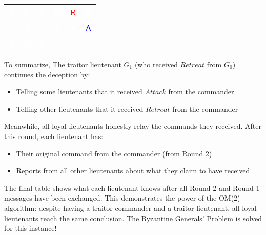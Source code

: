 \documentclass[11pt]{article}
\newcommand{\cmdA}{\ensuremath{\mathsf{A}}} %
\newcommand{\cmdR}{\ensuremath{\mathsf{R}}} %
\newcommand{\gen}[1]{\ensuremath{G_{#1}}}
\begin{document}
\begin{center}
\begin{tabular}{c|c|c|c|c|c}
    \hline
    \cellcolor{red!75}\textbf{\textcolor{white}{R}} & \cellcolor{red!75}\textbf{\textcolor{white}{R}} & \cellcolor{red!75}\textbf{\textcolor{white}{R}} & \cellcolor{red!75}\textbf{\textcolor{white}{R}} & \cellcolor{yellow!30}\textbf{\textcolor{red}{\cmdR}} & \cellcolor{red!75}\textbf{\textcolor{white}{R}} \\
    \hline
    \cellcolor{blue!75}\textbf{\textcolor{white}{A}} & \cellcolor{blue!75}\textbf{\textcolor{white}{A}} & \cellcolor{blue!75}\textbf{\textcolor{white}{A}} & \cellcolor{blue!75}\textbf{\textcolor{white}{A}} & \cellcolor{blue!75}\textbf{\textcolor{white}{A}} & \cellcolor{yellow!30}\textbf{\textcolor{blue}{\cmdA}} \\
    \hline
    \hline
    \cellcolor{red!45}\textbf{\textcolor{white}{R}} & \cellcolor{red!75}\textbf{\textcolor{white}{R}} & \cellcolor{red!75}\textbf{\textcolor{white}{R}} & \cellcolor{red!75}\textbf{\textcolor{white}{R}} & \cellcolor{red!75}\textbf{\textcolor{white}{R}} & \cellcolor{red!75}\textbf{\textcolor{white}{R}} \\
\end{tabular}
\label{tab:traitor_commander_final_table}
\end{center}

\par\vspace{0.3em}


\justifying
To summarize, The traitor lieutenant $\gen{1}$ (who received $Retreat$ from $\gen{0}$) continues the deception by:
\begin{itemize}
    \item Telling some lieutenants that it received $Attack$ from the commander
    \item Telling other lieutenants that it received $Retreat$ from the commander
\end{itemize}

Meanwhile, all loyal lieutenants honestly relay the commands they received. After this round, each lieutenant has:
\begin{itemize}
    \item Their original command from the commander (from Round 2)
    \item Reports from all other lieutenants about what they claim to have received
\end{itemize}

The final table shows what each lieutenant knows after all Round 2 and Round 1 messages have been exchanged.
This demonstrates the power of the OM(2) algorithm: despite having a traitor commander and a traitor lieutenant, all loyal lieutenants reach the same conclusion. The Byzantine Generals' Problem is solved for this instance!
\end{document}
